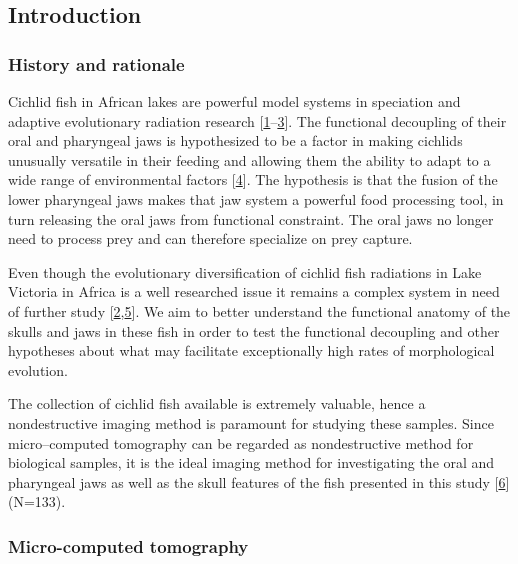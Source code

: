\hypertarget{introduction}{%
\subsection{Introduction}\label{introduction}}

\hypertarget{history-and-rationale}{%
\subsubsection{History and rationale}\label{history-and-rationale}}

Cichlid fish in African lakes are powerful model systems in speciation and adaptive evolutionary radiation research {[}\protect\hyperlink{ref-TUQFenhc}{1}--\protect\hyperlink{ref-WVIa4CH0}{3}{]}.
The functional decoupling of their oral and pharyngeal jaws is hypothesized to be a factor in making cichlids unusually versatile in their feeding and allowing them the ability to adapt to a wide range of environmental factors {[}\protect\hyperlink{ref-1GEljkDsf}{4}{]}.
The hypothesis is that the fusion of the lower pharyngeal jaws makes that jaw system a powerful food processing tool, in turn releasing the oral jaws from functional constraint.
The oral jaws no longer need to process prey and can therefore specialize on prey capture.

Even though the evolutionary diversification of cichlid fish radiations in Lake Victoria in Africa is a well researched issue it remains a complex system in need of further study {[}\protect\hyperlink{ref-W2f2SDjn}{2},\protect\hyperlink{ref-c3poTogo}{5}{]}.
We aim to better understand the functional anatomy of the skulls and jaws in these fish in order to test the functional decoupling and other hypotheses about what may facilitate exceptionally high rates of morphological evolution.

The collection of cichlid fish available is extremely valuable, hence a nondestructive imaging method is paramount for studying these samples.
Since micro--computed tomography can be regarded as nondestructive method for biological samples, it is the ideal imaging method for investigating the oral and pharyngeal jaws as well as the skull features of the fish presented in this study {[}\protect\hyperlink{ref-19h9vxsYG}{6}{]} (N=133).

\hypertarget{micro-computed-tomography}{%
\subsubsection{Micro-computed tomography}\label{micro-computed-tomography}}

